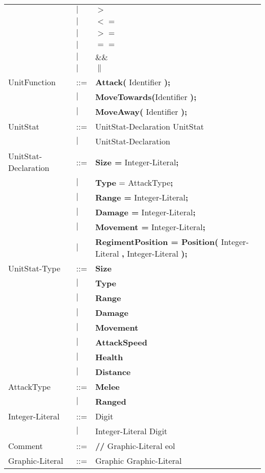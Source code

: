\begin{center}
\begin{longtable}{l l l}
									&$\mid$	&$\boldsymbol {>}$\\
									&$\mid$	&$\boldsymbol {<=}$\\
									&$\mid$	&$\boldsymbol {>=}$\\
									&$\mid$	&$\boldsymbol {==}$\\
									&$\mid$	&$\boldsymbol {\&\&}$\\
									&$\mid$	&$\boldsymbol {\|}$\\
				UnitFunction		&	::=	&{\bf Attack(} Identifier {\bf );} \\
									&$\mid$	&{\bf MoveTowards(}Identifier {\bf );} \\
									&$\mid$	&{\bf MoveAway(} Identifier {\bf );} \\
				UnitStat			&	::=	&UnitStat-Declaration UnitStat \\
									&$\mid$	&UnitStat-Declaration \\
				UnitStat-Declaration&	::=	&{\bf Size =} Integer-Literal{\bf ;} \\
									&$\mid$	&{\bf Type} = AttackType{\bf ;}\\
									&$\mid$	&{\bf  Range =} Integer-Literal{\bf;}\\
									&$\mid$	&{\bf Damage =} Integer-Literal{\bf ;}\\
									&$\mid$	&{\bf Movement = }Integer-Literal{\bf ;} \\				  
									&$\mid$	& {\bf RegimentPosition = Position(} Integer-Literal {\bf ,} Integer-Literal {\bf );}\\
				UnitStat-Type		&	::=	&{\bf Size}\\
									&$\mid$	&{\bf Type}\\
									&$\mid$	&{\bf  Range}\\
									&$\mid$	&{\bf Damage}\\
									&$\mid$	&{\bf Movement}\\
									&$\mid$	&{\bf AttackSpeed}\\
									&$\mid$	&{\bf Health}\\
									&$\mid$	&{\bf Distance}\\
				AttackType			&	::=	&{\bf Melee}\\
									&$\mid$	&{\bf Ranged}\\
				Integer-Literal		&	::=	&Digit\\
									&$\mid$	&Integer-Literal Digit\\
				Comment				&	::=	&{\bf //} Graphic-Literal eol\\
				Graphic-Literal		&	::=	&Graphic Graphic-Literal\\

\end{longtable}
\end{center}
